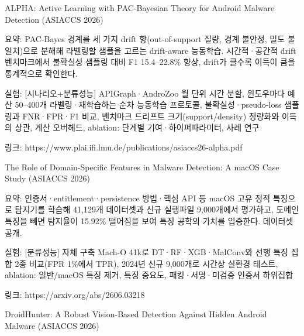\par\noindent \textbullet\enspace ALPHA: Active Learning with PAC-Bayesian Theory for Android Malware Detection (ASIACCS 2026)

\par\noindent \textbullet\enspace 요약: PAC-Bayes 경계를 세 가지 drift 항(out-of-support 질량, 경계 불안정, 밀도 불일치)으로 분해해 라벨링할 샘플을 고르는 drift-aware 능동학습. 시간적·공간적 drift 벤치마크에서 불확실성 샘플링 대비 F1 15.4–22.8\% 향상, drift가 클수록 이득이 큼을 통계적으로 확인한다.


\par\noindent \textbullet\enspace 실험: [시나리오+\allowbreak{}분류성능] APIGraph·AndroZoo 월 단위 시간 분할, 윈도우마다 예산 50–400개 라벨링·재학습하는 순차 능동학습 프로토콜, 불확실성·pseudo-loss 샘플링과 FNR·FPR·F1 비교, 벤치마크 드리프트 크기(support/\allowbreak{}density) 정량화와 이득의 상관, 계산 오버헤드, ablation: 단계별 기여·하이퍼파라미터, 사례 연구


\par\noindent \textbullet\enspace 링크: https:/\allowbreak{}/\allowbreak{}www.plai.ifi.lmu.de/\allowbreak{}publications/\allowbreak{}asiaccs26-alpha.pdf



\par\noindent \textbullet\enspace The Role of Domain-Specific Features in Malware Detection: A macOS Case Study (ASIACCS 2026)

\par\noindent \textbullet\enspace 요약: 인증서·entitlement·persistence 방법·핵심 API 등 macOS 고유 정적 특징으로 탐지기를 학습해 41,129개 데이터셋과 신규 실행파일 9,000개에서 평가하고, 도메인 특징을 빼면 탐지율이 15.92\% 떨어짐을 보여 특징 공학의 가치를 입증한다. 데이터셋 공개.


\par\noindent \textbullet\enspace 실험: [분류성능] 자체 구축 Mach-O 41k로 DT·RF·XGB·MalConv와 선행 특징 집합 2종 비교(FPR 1\%에서 TPR), 2024년 신규 9,000개로 시간상 실환경 테스트, ablation: 일반/\allowbreak{}macOS 특징 제거, 특징 중요도, 패킹·서명·미검증 인증서 하위집합


\par\noindent \textbullet\enspace 링크: https:/\allowbreak{}/\allowbreak{}arxiv.org/\allowbreak{}abs/\allowbreak{}2606.03218



\par\noindent \textbullet\enspace DroidHunter: A Robust Vision-Based Detection Against Hidden Android Malware (ASIACCS 2026)

